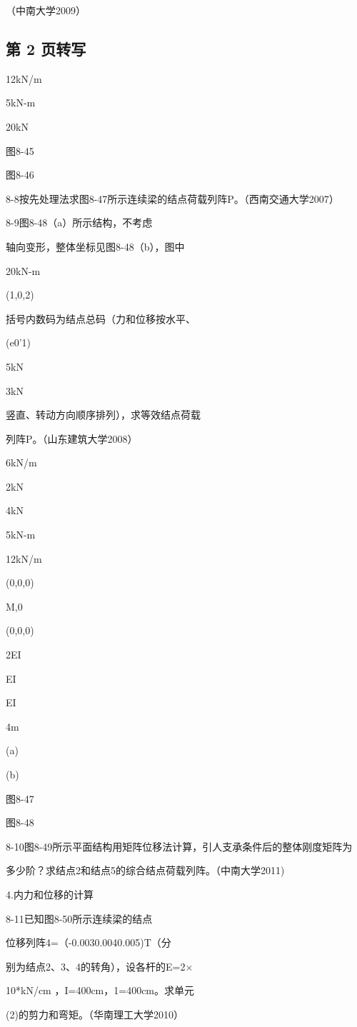 （中南大学2009）

\subsection*{第 2 页转写}
12kN/m

5kN-m

20kN

图8-45

图8-46

8-8按先处理法求图8-47所示连续梁的结点荷载列阵P。（西南交通大学2007）

8-9图8-48（a）所示结构，不考虑

轴向变形，整体坐标见图8-48（b），图中

20kN-m

(1,0,2)

括号内数码为结点总码（力和位移按水平、

(e0'1)

5kN

3kN

竖直、转动方向顺序排列），求等效结点荷载

列阵P。（山东建筑大学2008）

6kN/m

2kN

4kN

5kN-m

12kN/m

(0,0,0)

M,0

(0,0,0)

2EI

EI

EI

4m

(a)

(b)

图8-47

图8-48

8-10图8-49所示平面结构用矩阵位移法计算，引人支承条件后的整体刚度矩阵为

多少阶？求结点2和结点5的综合结点荷载列阵。（中南大学2011)

4.内力和位移的计算

8-11已知图8-50所示连续梁的结点

位移列阵4=（-0.0030.0040.005)T（分

别为结点2、3、4的转角），设各杆的E=2$\times$

10*kN/cm ，I=400cm，1=400cm。求单元

(2)的剪力和弯矩。（华南理工大学2010）

